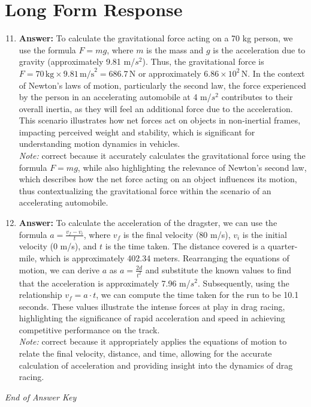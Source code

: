 \documentclass[12pt]{article}
\begin{document}
\section*{Long Form Response}
\begin{enumerate}[label=\arabic*.]
\setcounter{enumi}{10}
\item \textbf{Answer:} To calculate the gravitational force acting on a 70 kg person, we use the formula \( F = mg \), where \( m \) is the mass and \( g \) is the acceleration due to gravity (approximately 9.81 m/$s^2$). Thus, the gravitational force is \( F = 70 \, \text{kg} \times 9.81 \, \text{m/s}^2 = 686.7 \, \text{N} \) or approximately \( 6.86 \times 10^2 \, \text{N} \). In the context of Newton's laws of motion, particularly the second law, the force experienced by the person in an accelerating automobile at 4 m/$s^2$ contributes to their overall inertia, as they will feel an additional force due to the acceleration. This scenario illustrates how net forces act on objects in non-inertial frames, impacting perceived weight and stability, which is significant for understanding motion dynamics in vehicles.
\\ \textit{Note:} correct because it accurately calculates the gravitational force using the formula \( F = mg \), while also highlighting the relevance of Newton's second law, which describes how the net force acting on an object influences its motion, thus contextualizing the gravitational force within the scenario of an accelerating automobile.
\item \textbf{Answer:} To calculate the acceleration of the dragster, we can use the formula \( a = \frac{v_f - v_i}{t} \), where \( v_f \) is the final velocity (80 m/s), \( v_i \) is the initial velocity (0 m/s), and \( t \) is the time taken. The distance covered is a quarter-mile, which is approximately 402.34 meters. Rearranging the equations of motion, we can derive \( a \) as \( a = \frac{2 d}{t^2} \) and substitute the known values to find that the acceleration is approximately 7.96 m/$s^2$. Subsequently, using the relationship \( v_f = a \cdot t \), we can compute the time taken for the run to be 10.1 seconds. These values illustrate the intense forces at play in drag racing, highlighting the significance of rapid acceleration and speed in achieving competitive performance on the track.
\\ \textit{Note:} correct because it appropriately applies the equations of motion to relate the final velocity, distance, and time, allowing for the accurate calculation of acceleration and providing insight into the dynamics of drag racing.
\end{enumerate}

\vfill
\noindent\textit{End of Answer Key}
\end{document}
